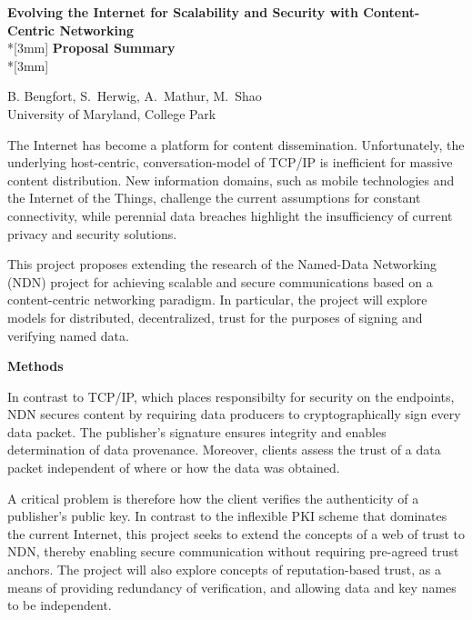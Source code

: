 \documentclass{proposalnsf}
\begin{document}
\begin{center}
{\Large{\bf Evolving the Internet for Scalability and Security with
    Content-Centric Networking}}\\*[3mm]
{\bf Proposal Summary} \\*[3mm]

B. Bengfort, S.\ Herwig, A.\ Mathur, M.\ Shao\\
University of Maryland, College Park

\end{center}


The Internet has become a platform for content dissemination.  Unfortunately,
the underlying host-centric, conversation-model of TCP/IP is inefficient
for massive content distribution.  New information domains, such as mobile
technologies and the Internet of the Things, challenge the current assumptions
for constant connectivity, while perennial data breaches highlight the
insufficiency of current privacy and security solutions.

This project proposes extending the research of the Named-Data Networking (NDN)
project for achieving scalable and secure communications based on a
content-centric networking paradigm.  In particular, the project will
explore models for distributed, decentralized, trust for the purposes of
signing and verifying named data.

\noindent
{\bf Methods}

In contrast to TCP/IP, which places responsibilty for security on the
endpoints, NDN secures content by requiring data producers to cryptographically
sign every data packet.  The publisher's signature ensures integrity and
enables determination of data provenance.  Moreover, clients assess the trust
of a data packet independent of where or how the data was obtained.

A critical problem is therefore how the client verifies the authenticity of a
publisher's public key.  In contrast to the inflexible PKI scheme that
dominates the current Internet, this project seeks to extend the concepts of a
web of trust to NDN, thereby enabling secure communication without requiring
pre-agreed trust anchors.  The project will also explore concepts of
reputation-based trust, as a means of providing redundancy of verification, and
allowing data and key names to be independent.
\end{document}
